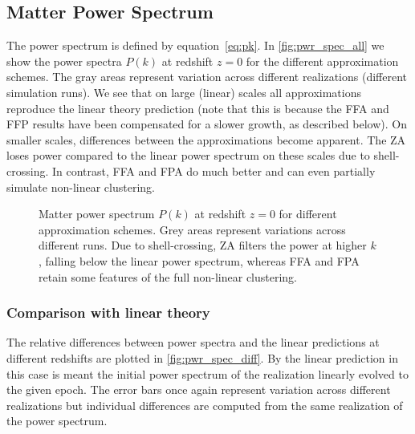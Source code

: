 \subsection{Matter Power Spectrum}
\label{sec:pwr_spec}
The power spectrum is defined by equation~\eqref{eq:pk}. In \autoref{fig:pwr_spec_all} we show the power spectra $P(k)$ at redshift $z=0$ for the different approximation schemes. The gray areas represent variation across different realizations (different simulation runs). We see that on large (linear) scales all approximations reproduce the linear theory prediction (note that this is because the FFA and FFP results have been compensated for a slower growth, as described below). On smaller scales, differences between the approximations become apparent. The ZA loses power compared to the linear power spectrum on these scales due to shell-crossing. In contrast, FFA and FPA do much better and can even partially simulate non-linear clustering.

\begin{figure}
\centering
	\begin{subfigure}{\textwidth}
	\end{subfigure}
	\begin{subfigure}{\textwidth}
	\end{subfigure}%
    \caption{Matter power spectrum $P(k)$ at redshift $z=0$ for different approximation schemes. Grey areas represent variations across different runs. Due to shell-crossing, ZA filters the power at higher $k$, falling below the linear power spectrum, whereas FFA and FPA retain some features of the full non-linear clustering.}
    \label{fig:pwr_spec_all}
\end{figure}

\subsubsection{Comparison with linear theory}
The relative differences between power spectra and the linear predictions at different redshifts are plotted in \autoref{fig:pwr_spec_diff}. By the linear prediction in this case is meant the initial power spectrum of the realization linearly evolved to the given epoch. The error bars once again represent variation across different realizations but individual differences are computed from the same realization of the power spectrum.

